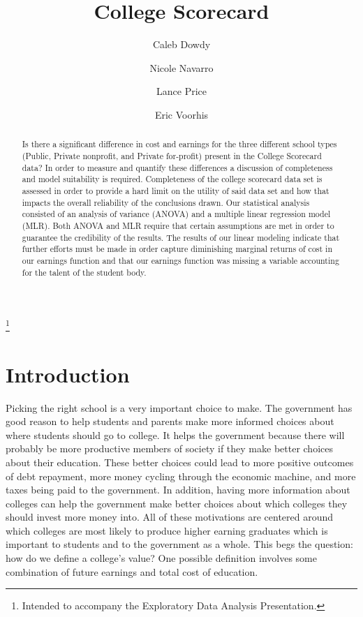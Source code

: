 \documentclass[%
 reprint,
 amsmath,amssymb,
 aps,
]{revtex4-1}
\begin{document}
\title{College Scorecard}%
\thanks{Intended to accompany the Exploratory Data Analysis Presentation.}%

\author{Caleb Dowdy}
\author{Nicole Navarro}
\author{Lance Price}
\author{Eric Voorhis}


\begin{abstract}
Is there a significant difference in cost and earnings for the three different school types (Public, Private nonprofit, and Private for-profit) present in the College Scorecard data? In order to measure and quantify these differences a discussion of completeness and model suitability is required. Completeness of the college scorecard data set is assessed in order to provide a hard limit on the utility of said data set and how that impacts the overall reliability of the conclusions drawn. Our statistical analysis consisted of an analysis of variance (ANOVA) and a multiple linear regression model (MLR). Both ANOVA and MLR require that certain assumptions are met in order to guarantee the credibility of the results. The results of our linear modeling indicate that further efforts must be made in order capture diminishing marginal returns of cost in our earnings function and that our earnings function was missing a variable accounting for the talent of the student body.
\end{abstract}

\maketitle

\section{\label{sec:level1}Introduction}
Picking the right school is a very important choice to make.  The government has good reason to help students and parents make more informed choices about where students should go to college.  It helps the government because there will probably be more productive members of society if they make better choices about their education.  These better choices could lead to more positive outcomes of debt repayment, more money cycling through the economic machine, and more taxes being paid to the government.  In addition, having more information about colleges can help the government make better choices about which colleges they should invest more money into.  All of these motivations are centered around which colleges are most likely to produce higher earning graduates which is important to students and to the government as a whole.  This begs the question: how do we define a college's value?  One possible definition involves some combination of future earnings and total cost of education.
\end{document}
